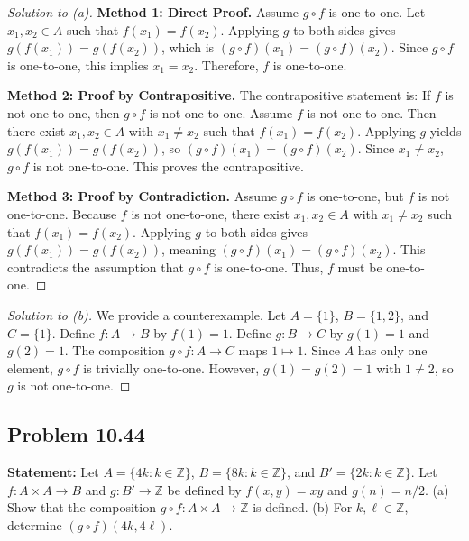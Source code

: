 \documentclass[11pt, a4paper]{article}
\theoremstyle{definition}
\theoremstyle{remark}
\newcommand{\Z}{\mathbb{Z}}
\begin{document}
\begin{proof}[Solution to (a)]
\textbf{Method 1: Direct Proof.} Assume $g \circ f$ is one-to-one. Let $x_1, x_2 \in A$ such that $f(x_1) = f(x_2)$. Applying $g$ to both sides gives $g(f(x_1)) = g(f(x_2))$, which is $(g \circ f)(x_1) = (g \circ f)(x_2)$. Since $g \circ f$ is one-to-one, this implies $x_1 = x_2$. Therefore, $f$ is one-to-one.

\textbf{Method 2: Proof by Contrapositive.} The contrapositive statement is: If $f$ is not one-to-one, then $g \circ f$ is not one-to-one. Assume $f$ is not one-to-one. Then there exist $x_1, x_2 \in A$ with $x_1 \neq x_2$ such that $f(x_1) = f(x_2)$. Applying $g$ yields $g(f(x_1)) = g(f(x_2))$, so $(g \circ f)(x_1) = (g \circ f)(x_2)$. Since $x_1 \neq x_2$, $g \circ f$ is not one-to-one. This proves the contrapositive.

\textbf{Method 3: Proof by Contradiction.} Assume $g \circ f$ is one-to-one, but $f$ is not one-to-one. Because $f$ is not one-to-one, there exist $x_1, x_2 \in A$ with $x_1 \neq x_2$ such that $f(x_1) = f(x_2)$. Applying $g$ to both sides gives $g(f(x_1)) = g(f(x_2))$, meaning $(g \circ f)(x_1) = (g \circ f)(x_2)$. This contradicts the assumption that $g \circ f$ is one-to-one. Thus, $f$ must be one-to-one.
\end{proof}

\begin{proof}[Solution to (b)]
We provide a counterexample. Let $A = \{1\}$, $B = \{1, 2\}$, and $C = \{1\}$. Define $f: A \to B$ by $f(1) = 1$. Define $g: B \to C$ by $g(1) = 1$ and $g(2) = 1$. The composition $g \circ f: A \to C$ maps $1 \mapsto 1$. Since $A$ has only one element, $g \circ f$ is trivially one-to-one. However, $g(1) = g(2) = 1$ with $1 \neq 2$, so $g$ is not one-to-one.
\end{proof}

\subsection*{Problem 10.44}
\textbf{Statement:} Let $A = \{4k : k \in \Z\}$, $B = \{8k : k \in \Z\}$, and $B' = \{2k : k \in \Z\}$. Let $f: A \times A \to B$ and $g: B' \to \Z$ be defined by $f(x, y) = xy$ and $g(n) = n/2$.
(a) Show that the composition $g \circ f: A \times A \to \Z$ is defined.
(b) For $k, \ell \in \Z$, determine $(g \circ f)(4k, 4\ell)$.
\end{document}
